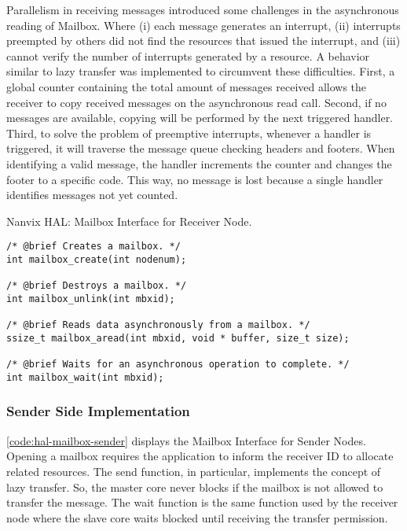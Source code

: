 					Parallelism in receiving messages introduced some challenges in the
					asynchronous reading of Mailbox. Where (i) each message generates an
					interrupt, (ii) interrupts preempted by others did not find the \dnoc
					resources that issued the interrupt, and (iii) cannot verify the
					number of interrupts generated by a resource. A behavior similar to
					lazy transfer was implemented to circumvent these difficulties.
					First, a global counter containing the total amount of messages
					received allows the receiver to copy received messages on the
					asynchronous read call. Second, if no messages are available, copying
					will be performed by the next triggered handler. Third, to solve the
					problem of preemptive interrupts, whenever a handler is triggered,
					it will traverse the message queue checking headers and footers.
					When identifying a valid message, the handler increments the counter
					and changes the footer to a specific code. This way, no message is
					lost because a single handler identifies messages not yet counted.

\begin{listing}[!tb]
\caption{Nanvix HAL: Mailbox Interface for Receiver Node.}
\label{code:hal-mailbox-receiver}
\begin{verbatim}
/* @brief Creates a mailbox. */
int mailbox_create(int nodenum);

/* @brief Destroys a mailbox. */
int mailbox_unlink(int mbxid);

/* @brief Reads data asynchronously from a mailbox. */
ssize_t mailbox_aread(int mbxid, void * buffer, size_t size);

/* @brief Waits for an asynchronous operation to complete. */
int mailbox_wait(int mbxid);
\end{verbatim}
\end{listing}

			\subsubsection{Sender Side Implementation}

				\autoref{code:hal-mailbox-sender} displays the Mailbox Interface for
				Sender Nodes. Opening a mailbox requires the application to inform
				the receiver ID to allocate related resources. The send function,
				in particular, implements the concept of lazy transfer. So, the master
				core never blocks if the mailbox is not allowed to transfer the message.
				The wait function is the same function used by the receiver node where
				the slave core waits blocked until receiving the transfer permission.

